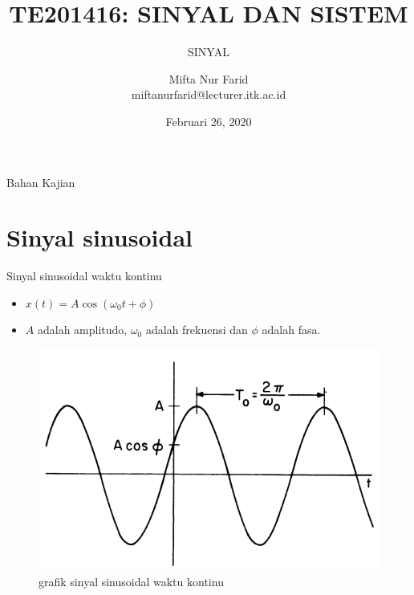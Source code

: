 \documentclass[aspectratio=169]{beamer}
\author{Mifta Nur Farid \\
	miftanurfarid@lecturer.itk.ac.id}
\title{TE201416: SINYAL DAN SISTEM}
\subtitle{SINYAL}
\institute{Teknik Elektro \\ Institut Teknologi Kalimantan \\ Balikpapan, Indonesia}
\date{\tiny Februari 26, 2020}
\begin{document}
\begin{frame}[t,plain]
\titlepage
\end{frame}

\begin{frame}{Bahan Kajian}
    \tableofcontents[subsectionstyle=hide]
\end{frame}

\section{Sinyal sinusoidal}
\begin{frame}{Sinyal sinusoidal waktu kontinu}
	\begin{itemize}
		\item $ x(t) = A \cos(\omega_0 t + \phi) $
		\item $ A $ adalah amplitudo, $ \omega_0 $ adalah frekuensi dan $ \phi $ adalah fasa.
	\end{itemize}
	\begin{figure}
		\centering
		\includegraphics[height=0.6\textheight]{gambar/01.sinyal_sinusoidal_waktu_kontinu}
		\caption{grafik sinyal sinusoidal waktu kontinu} \label{sinusoidal}
	\end{figure}
\end{frame}
\end{document}
